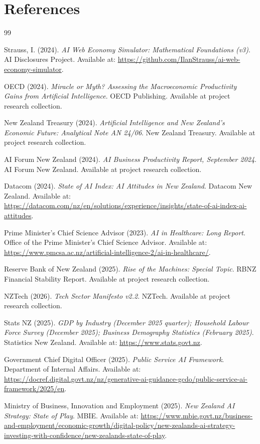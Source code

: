 \documentclass[11pt,a4paper]{article}
\begin{document}
\section{References}

\begin{thebibliography}{99}

Strauss, I. (2024). \textit{AI Web Economy Simulator: Mathematical Foundations (v3)}. AI Disclosures Project. Available at: \url{https://github.com/IlanStrauss/ai-web-economy-simulator}.

OECD (2024). \textit{Miracle or Myth? Assessing the Macroeconomic Productivity Gains from Artificial Intelligence}. OECD Publishing. Available at project research collection.

New Zealand Treasury (2024). \textit{Artificial Intelligence and New Zealand's Economic Future: Analytical Note AN 24/06}. New Zealand Treasury. Available at project research collection.

AI Forum New Zealand (2024). \textit{AI Business Productivity Report, September 2024}. AI Forum New Zealand. Available at project research collection.

Datacom (2024). \textit{State of AI Index: AI Attitudes in New Zealand}. Datacom New Zealand. Available at: \url{https://datacom.com/nz/en/solutions/experience/insights/state-of-ai-index-ai-attitudes}.

Prime Minister's Chief Science Advisor (2023). \textit{AI in Healthcare: Long Report}. Office of the Prime Minister's Chief Science Advisor. Available at: \url{https://www.pmcsa.ac.nz/artificial-intelligence-2/ai-in-healthcare/}.

Reserve Bank of New Zealand (2025). \textit{Rise of the Machines: Special Topic}. RBNZ Financial Stability Report. Available at project research collection.

NZTech (2026). \textit{Tech Sector Manifesto v2.2}. NZTech. Available at project research collection.

Stats NZ (2025). \textit{GDP by Industry (December 2025 quarter); Household Labour Force Survey (December 2025); Business Demography Statistics (February 2025)}. Statistics New Zealand. Available at: \url{https://www.stats.govt.nz}.

Government Chief Digital Officer (2025). \textit{Public Service AI Framework}. Department of Internal Affairs. Available at: \url{https://docref.digital.govt.nz/nz/generative-ai-guidance-gcdo/public-service-ai-framework/2025/en}.

Ministry of Business, Innovation and Employment (2025). \textit{New Zealand AI Strategy: State of Play}. MBIE. Available at: \url{https://www.mbie.govt.nz/business-and-employment/economic-growth/digital-policy/new-zealands-ai-strategy-investing-with-confidence/new-zealands-state-of-play}.

\end{thebibliography}
\end{document}
